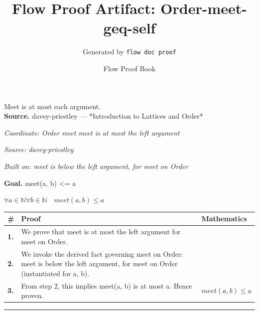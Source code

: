 \documentclass[11pt]{article}
\title{Flow Proof Artifact: Order-meet-geq-self}
\author{Generated by \texttt{flow doc proof}}
\date{Flow Proof Book}
\theoremstyle{definition}
\begin{document}
\maketitle
Meet is at most each argument.\\[0.5em]
\textbf{Source.} davey-priestley — *Introduction to Lattices and Order*\\[0.5em]
\bigskip
{}\par
\smallskip\noindent\textit{Coordinate: Order \cdot meet \cdot meet is at most the left argument}\par
\smallskip\noindent\textit{Source: davey-priestley}\par
\smallskip\noindent\textit{Built on: meet is below the left argument, for meet on Order}\par
\medskip
\noindent\textbf{Goal.} meet(a, b) <= a\par
\noindent$\displaystyle \forall a \in \mathbb{N} \forall b \in \mathbb{N}\quad meet(a, b) \le a$\par
\medskip
\noindent
\begin{tabular}{@{} >{\raggedright\arraybackslash}p{} >{\raggedright\arraybackslash}p{} >{\raggedleft\arraybackslash}p{} @{}}
\textbf{\#} & \textbf{Proof} & \textbf{Mathematics} \\
\midrule
\textbf{1.} & We prove that meet is at most the left argument for meet on Order. & \\[0.45em]
\textbf{2.} & We invoke the derived fact governing meet on Order: meet is below the left argument, for meet on Order (instantiated for a, b). & \\[0.45em]
\textbf{3.} & From step 2, this implies meet(a, b) is at most a. Hence proven. & $\displaystyle meet(a, b) \le a$ \\[0.45em]
\bottomrule
\end{tabular}
\label{thm:Order-meet-meet_is_at_most_the_left_argument}
\par\medskip\hrule
\end{document}
